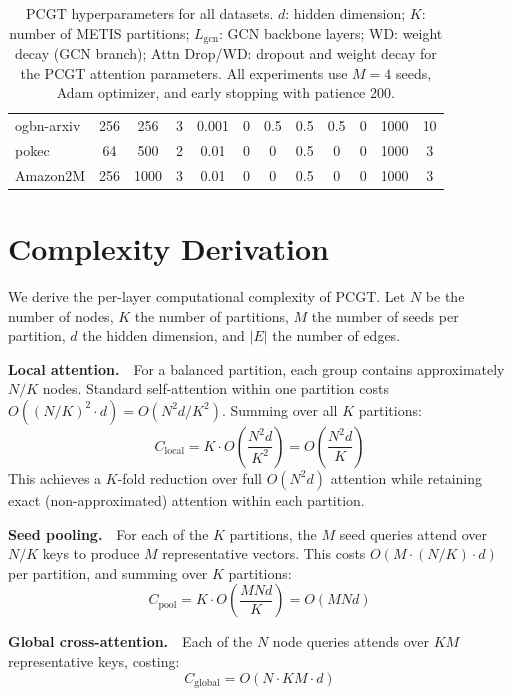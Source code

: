 \begin{table}[t]
{\begin{tabular}{l|ccccccccccc}
\midrule
ogbn-arxiv   & 256 & 256 & 3 & 0.001 & 0     & 0.5 & 0.5 & 0.5 & 0    & 1000 & 10 \\
pokec        & 64  & 500 & 2 & 0.01  & 0     & 0   & 0.5 & 0   & 0    & 1000 & 3 \\
Amazon2M     & 256 & 1000 & 3 & 0.01 & 0     & 0   & 0.5 & 0   & 0    & 1000 & 3 \\
\bottomrule
\end{tabular}
}%
\caption{PCGT hyperparameters for all datasets. $d$: hidden dimension; $K$: number of METIS partitions; $L_\text{gcn}$: GCN backbone layers; WD: weight decay (GCN branch); Attn Drop/WD: dropout and weight decay for the PCGT attention parameters. All experiments use $M=4$ seeds, Adam optimizer, and early stopping with patience 200.}
\label{tab:hyperparams}
\end{table}

\section{Complexity Derivation}
\label{app:complexity}

We derive the per-layer computational complexity of PCGT. Let $N$ be the number of nodes, $K$ the number of partitions, $M$ the number of seeds per partition, $d$ the hidden dimension, and $|E|$ the number of edges.

\textbf{Local attention.}~~For a balanced partition, each group contains approximately $N/K$ nodes. Standard self-attention within one partition costs $O((N/K)^2 \cdot d) = O(N^2 d / K^2)$. Summing over all $K$ partitions:
\begin{equation}
C_\text{local} = K \cdot O\!\left(\frac{N^2 d}{K^2}\right) = O\!\left(\frac{N^2 d}{K}\right)
\label{eq:local_cost}
\end{equation}
This achieves a $K$-fold reduction over full $O(N^2 d)$ attention while retaining exact (non-approximated) attention within each partition.

\textbf{Seed pooling.}~~For each of the $K$ partitions, the $M$ seed queries attend over $N/K$ keys to produce $M$ representative vectors. This costs $O(M \cdot (N/K) \cdot d)$ per partition, and summing over $K$ partitions:
\begin{equation}
C_\text{pool} = K \cdot O\!\left(\frac{MNd}{K}\right) = O(MNd)
\label{eq:pool_cost}
\end{equation}

\textbf{Global cross-attention.}~~Each of the $N$ node queries attends over $KM$ representative keys, costing:
\begin{equation}
C_\text{global} = O(N \cdot KM \cdot d)
\label{eq:global_cost}
\end{equation}


